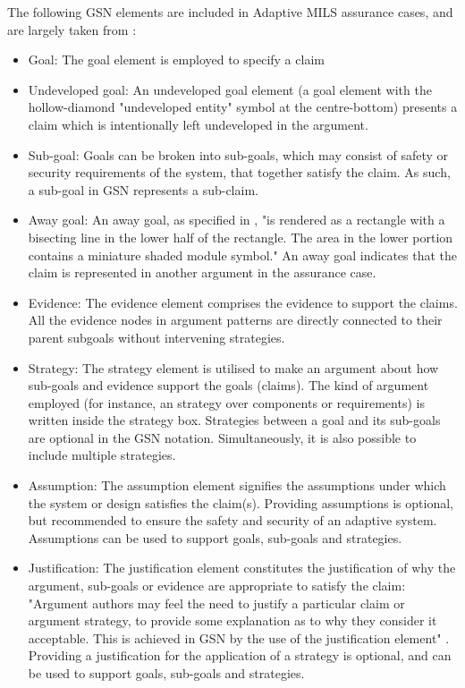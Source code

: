 \documentclass[12pt,twoside,a4paper]{article}
\begin{document}
The following GSN elements are included in Adaptive MILS assurance cases, and are largely taken from \cite{GSN_standard}:
	\begin{itemize}
	\item Goal: The goal element is employed to specify a claim 
	\item Undeveloped goal: An undeveloped goal element (a goal element with the hollow-diamond "undeveloped entity" symbol at the centre-bottom) presents a claim which is intentionally left undeveloped in the argument.
	\item Sub-goal: Goals can be broken into sub-goals, which may consist of safety or security requirements of the system, that together satisfy the claim. As such, a sub-goal in GSN represents a sub-claim. 
	\item Away goal: An away goal, as specified in \cite{GSN_standard}, "is rendered as a rectangle with a bisecting line in the lower half of the rectangle. The area in the lower portion contains a miniature shaded module symbol." An away goal indicates that the claim is represented in another argument in the assurance case.
	\item Evidence: The evidence element comprises the evidence to support the claims. All the evidence nodes in argument patterns are directly connected to their parent subgoals without intervening strategies.
	\item Strategy: The strategy element is utilised to make an argument about how sub-goals and evidence support the goals (claims). The kind of argument employed (for instance, an strategy over components or requirements) is written inside the strategy box. Strategies between a goal and its sub-goals are optional in the GSN notation. Simultaneously, it is also possible to include multiple strategies. 
	\item Assumption: The assumption element signifies the assumptions under which the system or design satisfies the claim(s). Providing assumptions is optional, but recommended to ensure the safety and security of an adaptive system. Assumptions can be used to support goals, sub-goals and strategies. 
	\item Justification: The justification element constitutes the justification of why the argument, sub-goals or evidence are appropriate to satisfy the claim: "Argument authors may feel the need to justify a particular claim or argument strategy, to provide some explanation as to why they consider it acceptable. This is achieved in GSN by the use of the justification element" \cite{GSN_standard}. Providing a justification for the application of a strategy is optional, and can be used to support goals, sub-goals and strategies. 

\end{itemize}
\end{document}

